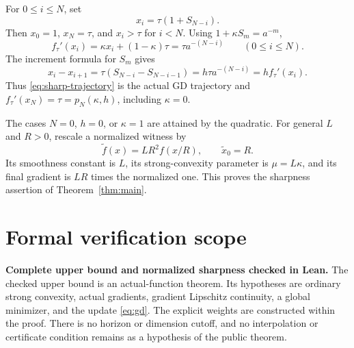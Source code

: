 \documentclass[11pt]{article}
\numberwithin{equation}{section}
\theoremstyle{remark}
\newcommand{\status}{Complete upper bound and normalized sharpness checked in Lean}
\begin{document}
For $0\leq i\leq N$, set
\begin{equation}
x_i=\tau(1+S_{N-i}).
\label{eq:sharp-trajectory}
\end{equation}
Then $x_0=1$, $x_N=\tau$, and $x_i>\tau$ for $i<N$.
Using $1+\kappa S_m=a^{-m}$,
\[
f_\tau'(x_i)=\kappa x_i+(1-\kappa)\tau
=\tau a^{-(N-i)}\qquad(0\leq i\leq N).
\]
The increment formula for $S_m$ gives
\[
x_i-x_{i+1}
=\tau(S_{N-i}-S_{N-i-1})
=h\tau a^{-(N-i)}=h f_\tau'(x_i).
\]
Thus \eqref{eq:sharp-trajectory} is the actual GD trajectory and
$f_\tau'(x_N)=\tau=p_N(\kappa,h)$, including $\kappa=0$.

The cases $N=0$, $h=0$, or $\kappa=1$ are attained by the quadratic.
For general $L$ and $R>0$, rescale a normalized witness by
\[
\widetilde f(x)=LR^2 f(x/R),\qquad \widetilde x_0=R.
\]
Its smoothness constant is $L$, its strong-convexity parameter is
$\mu=L\kappa$, and its final gradient is $LR$ times the normalized one.
This proves the sharpness assertion of Theorem~\ref{thm:main}.

\section{Formal verification scope}
\label{sec:formal}

\textbf{\status.} The checked upper bound is an actual-function
theorem. Its hypotheses are ordinary strong convexity, actual
gradients, gradient Lipschitz continuity, a global minimizer, and the
update \eqref{eq:gd}. The explicit weights are constructed within the
proof. There is no horizon or dimension cutoff, and no interpolation
or certificate condition remains as a hypothesis of the public theorem.
\end{document}
